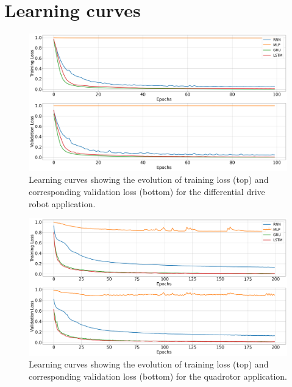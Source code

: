 \chapter{Learning curves}\label{chap:appendixB}

\begin{figure} [t]
    \centering
    \includegraphics[width=0.95\linewidth]{figures/learning_unic/learning_curves.png}
    \caption{Learning curves showing the evolution of training loss (top) and corresponding validation loss (bottom) for the differential drive robot application.}
    \label{fig:appendix_B_unic}
\end{figure}

\begin{figure} [t]
    \centering
    \includegraphics[width=0.95\linewidth]{figures/learning_quadrotor/learning_curves.png}
    \caption{Learning curves showing the evolution of training loss (top) and corresponding validation loss (bottom) for the quadrotor application.}
    \label{fig:appendix_B_unic}
\end{figure}